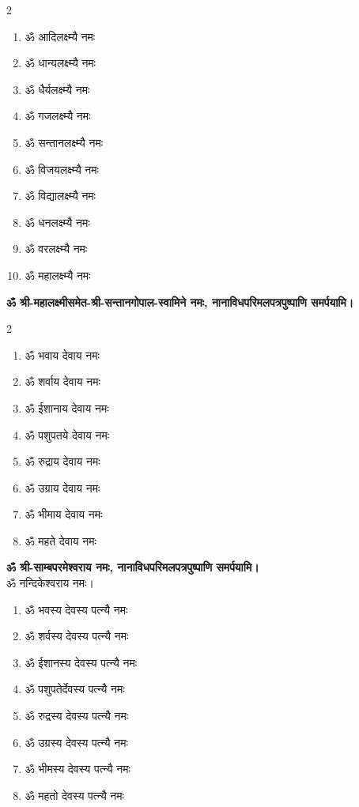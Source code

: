 \begin{center}
\begin{multicols}{2}
\begin{enumerate}
\item ॐ आदिलक्ष्म्यै नमः
\item ॐ धान्यलक्ष्म्यै नमः
\item ॐ धैर्यलक्ष्म्यै नमः
\item ॐ गजलक्ष्म्यै नमः
\item ॐ सन्तानलक्ष्म्यै नमः
\item ॐ विजयलक्ष्म्यै नमः
\item ॐ विद्यालक्ष्म्यै नमः
\item ॐ धनलक्ष्म्यै नमः
\item ॐ वरलक्ष्म्यै नमः
\item ॐ महालक्ष्म्यै नमः
\end{enumerate}
\end{multicols}

\textbf{ॐ श्री-महालक्ष्मीसमेत-श्री-सन्तानगोपाल-स्वामिने नमः, नानाविधपरिमलपत्रपुष्पाणि समर्पयामि।} \medskip

\clearpage
{}

\vspace{-1em}
\begin{multicols}{2}
\begin{enumerate}
\item ॐ भवाय देवाय नमः
\item ॐ शर्वाय देवाय नमः
\item ॐ ईशानाय देवाय नमः
\item ॐ पशुपतये देवाय नमः
\item ॐ रुद्राय देवाय नमः
\item ॐ उग्राय देवाय नमः
\item ॐ भीमाय देवाय नमः
\item ॐ महते देवाय नमः
\end{enumerate}
\end{multicols}
\vspace{-1em}
\textbf{ॐ श्री-साम्बपरमेश्वराय नमः, नानाविधपरिमलपत्रपुष्पाणि समर्पयामि।}\\
ॐ नन्दिकेश्वराय नमः।

\begin{enumerate}
\item ॐ भवस्य देवस्य पत्न्यै नमः
\item ॐ शर्वस्य देवस्य पत्न्यै नमः
\item ॐ ईशानस्य देवस्य पत्न्यै नमः
\item ॐ पशुपतेर्देवस्य पत्न्यै नमः
\item ॐ रुद्रस्य देवस्य पत्न्यै नमः
\item ॐ उग्रस्य देवस्य पत्न्यै नमः
\item ॐ भीमस्य देवस्य पत्न्यै नमः
\item ॐ महतो देवस्य पत्न्यै नमः
\end{enumerate}


\end{center}
